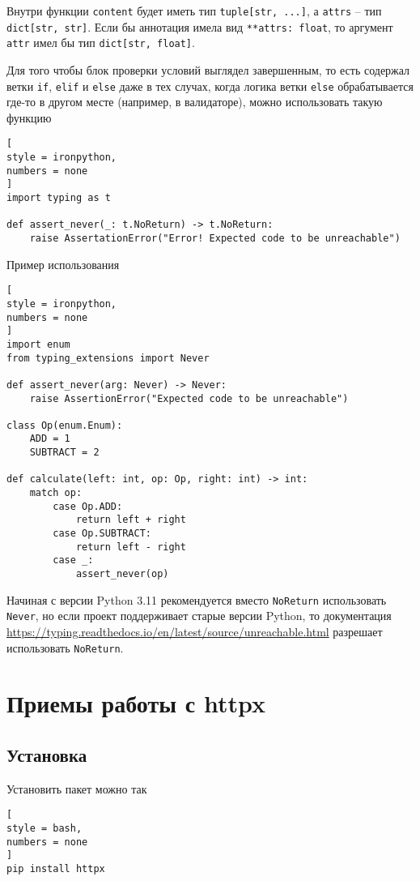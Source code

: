 \documentclass[%
	11pt,
	a4paper,
	utf8,
		]{article}
\begin{document}
Внутри функции \verb*|content| будет иметь тип \verb|tuple[str, ...]|, а \verb*|attrs| -- тип \verb|dict[str, str]|. Если бы аннотация имела вид \verb|**attrs: float|, то аргумент \verb*|attr| имел бы тип \verb|dict[str, float]|.

Для того чтобы блок проверки условий выглядел завершенным, то есть содержал ветки \verb*|if|, \verb*|elif| и \verb*|else| даже в тех случах, когда логика ветки \verb*|else| обрабатывается где-то в другом месте (например, в валидаторе), можно использовать такую функцию
\begin{lstlisting}[
style = ironpython,
numbers = none
]
import typing as t

def assert_never(_: t.NoReturn) -> t.NoReturn:
    raise AssertationError("Error! Expected code to be unreachable")
\end{lstlisting}

Пример использования
\begin{lstlisting}[
style = ironpython,
numbers = none
]
import enum
from typing_extensions import Never

def assert_never(arg: Never) -> Never:
	raise AssertionError("Expected code to be unreachable")

class Op(enum.Enum):
	ADD = 1
	SUBTRACT = 2

def calculate(left: int, op: Op, right: int) -> int:
	match op:
		case Op.ADD:
			return left + right
		case Op.SUBTRACT:
			return left - right
		case _:
			assert_never(op)
\end{lstlisting}

Начиная с версии Python 3.11 рекомендуется вместо \verb*|NoReturn| использовать \verb*|Never|, но если проект поддерживает старые версии Python, то документация \url{https://typing.readthedocs.io/en/latest/source/unreachable.html} разрешает использовать \verb*|NoReturn|.

\section{Приемы работы с httpx}

\subsection{Установка}

Установить пакет можно так
\begin{lstlisting}[
style = bash,
numbers = none
]
pip install httpx
\end{lstlisting}
\end{document}
